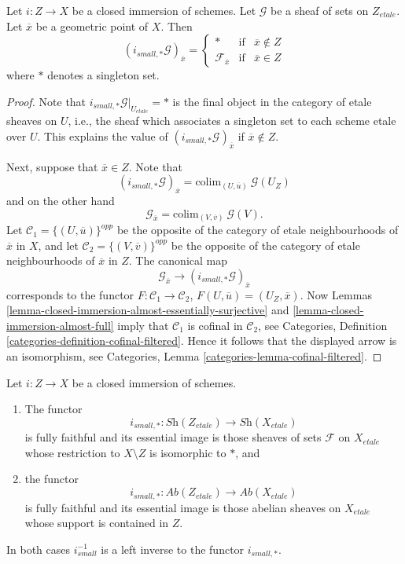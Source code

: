 \begin{lemma}
\label{lemma-stalk-pushforward-closed-immersion}
Let $i : Z \to X$ be a closed immersion of schemes.
Let $\mathcal{G}$ be a sheaf of sets on $Z_{etale}$.
Let $\overline{x}$ be a geometric point of $X$.
Then
$$
(i_{small, *}\mathcal{G})_{\overline{x}} =
\left\{
\begin{matrix}
* & \text{if} & \overline{x} \not \in Z \\
\mathcal{F}_{\overline{x}} & \text{if} & \overline{x} \in Z
\end{matrix}
\right.
$$
where $*$ denotes a singleton set.
\end{lemma}

\begin{proof}
Note that $i_{small, *}\mathcal{G}|_{U_{etale}} = *$ is the final
object in the category of etale sheaves on $U$, i.e., the sheaf
which associates a singleton set to each scheme etale over $U$.
This explains the value of $(i_{small, *}\mathcal{G})_{\overline{x}}$
if $\overline{x} \not \in Z$.

\medskip\noindent
Next, suppose that $\overline{x} \in Z$. Note that
$$
(i_{small, *}\mathcal{G})_{\overline{x}}
=
\text{colim}_{(U, \overline{u})}\ \mathcal{G}(U_Z)
$$
and on the other hand
$$
\mathcal{G}_{\overline{x}}
=
\text{colim}_{(V, \overline{v})}\ \mathcal{G}(V).
$$
Let $\mathcal{C}_1 = \{(U, \overline{u})\}^{opp}$ be the opposite of the
category of etale neighbourhoods of $\overline{x}$ in $X$, and let
$\mathcal{C}_2 = \{(V, \overline{v})\}^{opp}$ be the opposite of the
category of etale neighbourhoods of $\overline{x}$ in $Z$. The canonical map
$$
\mathcal{G}_{\overline{x}}
\longrightarrow
(i_{small, *}\mathcal{G})_{\overline{x}}
$$
corresponds to the functor $F : \mathcal{C}_1 \to \mathcal{C}_2$,
$F(U, \overline{u}) = (U_Z, \overline{x})$. Now
Lemmas \ref{lemma-closed-immersion-almost-essentially-surjective} and
\ref{lemma-closed-immersion-almost-full}
imply that $\mathcal{C}_1$ is cofinal in $\mathcal{C}_2$, see
Categories, Definition \ref{categories-definition-cofinal-filtered}.
Hence it follows that the displayed arrow is an isomorphism, see
Categories, Lemma \ref{categories-lemma-cofinal-filtered}.
\end{proof}

\begin{proposition}
\label{proposition-closed-immersion-pushforward}
Let $i : Z \to X$ be a closed immersion of schemes.
\begin{enumerate}
\item The functor
$$
i_{small, *} :
\textit{Sh}(Z_{etale})
\longrightarrow
\textit{Sh}(X_{etale})
$$
is fully faithful and its essential image is those sheaves of sets
$\mathcal{F}$ on $X_{etale}$ whose restriction to $X \setminus Z$ is
isomorphic to $*$, and
\item the functor
$$
i_{small, *} :
\textit{Ab}(Z_{etale})
\longrightarrow
\textit{Ab}(X_{etale})
$$
is fully faithful and its essential image is those abelian sheaves on
$X_{etale}$ whose support is contained in $Z$.
\end{enumerate}
In both cases $i_{small}^{-1}$ is a left inverse to the functor
$i_{small, *}$.
\end{proposition}

